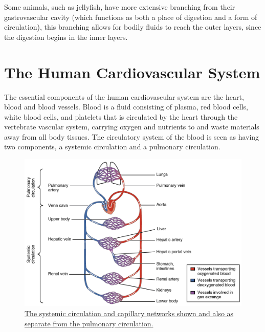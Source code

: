 Some animals, such as jellyfish, have more extensive branching from their gastrovascular cavity (which functions as both a place of digestion and a form of circulation), this branching allows for bodily fluids to reach the outer layers, since the digestion begins in the inner layers.

\hypertarget{the-human-cardiovascular-system}{%
\section{The Human Cardiovascular System}\label{the-human-cardiovascular-system}}

The essential components of the human cardiovascular system are the heart, blood and blood vessels. Blood is a fluid consisting of plasma, red blood cells, white blood cells, and platelets that is circulated by the heart through the vertebrate vascular system, carrying oxygen and nutrients to and waste materials away from all body tissues. The circulatory system of the blood is seen as having two components, a systemic circulation and a pulmonary circulation.



\begin{figure}

{\centering \includegraphics[width=0.7\linewidth]{./figures/circulation/2101_Blood_Flow_Through_the_Heart} 

}

\caption{\href{https://commons.wikimedia.org/wiki/File:2101_Blood_Flow_Through_the_Heart.jpg}{The systemic circulation and capillary networks shown and also as separate from the pulmonary circulation.}}\label{fig:systemiccirculation}
\end{figure}




